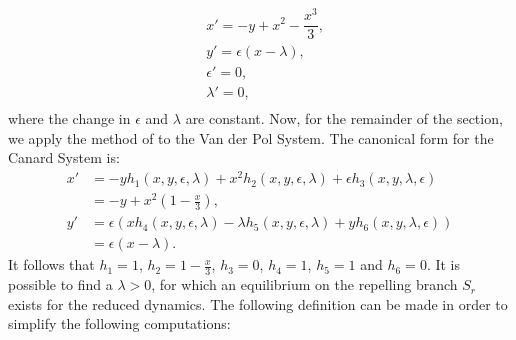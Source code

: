 \begin{equation}
\begin{aligned}
&x'=-y+x^2-\dfrac{x^3}{3},\\
&y'=\epsilon(x-\lambda),\\
&\epsilon'=0,\\
&\lambda'=0,\\
\end{aligned}
\label{eq: canard system}
\end{equation}
where the change in $\epsilon$ and $\lambda$ are constant. 
Now, for the remainder of the section, we apply the method of \citet{krupa2001} to the Van der Pol System. The canonical form for the Canard System is:
\begin{equation} \label{canardysy2var}
	\begin{aligned}
		x'&=-yh_1(x,y,\epsilon,\lambda)+x^2h_2(x,y,\epsilon,\lambda) + \epsilon h_3(x,y,\lambda,\epsilon)\\
                        &= -y + x^2 \left( 1- \frac{x}{3} \right),\\
		y'&=\epsilon(xh_4(x,y,\epsilon,\lambda)-\lambda h_5(x,y,\epsilon,\lambda) + y h_6(x,y,\lambda,\epsilon)) \\
                        &= \epsilon( x- \lambda).
	\end{aligned}
\end{equation}
It follows that $h_1 = 1$, $h_2 = 1-\frac{x}{3}$, $h_3=0$, $h_4 =1$, $h_5=1$ and $h_6=0$.
It is possible to find a $\lambda>0$, for which an equilibrium on the repelling branch $S_r$ exists for the reduced dynamics.
The following definition can be made in order to simplify the following computations:

